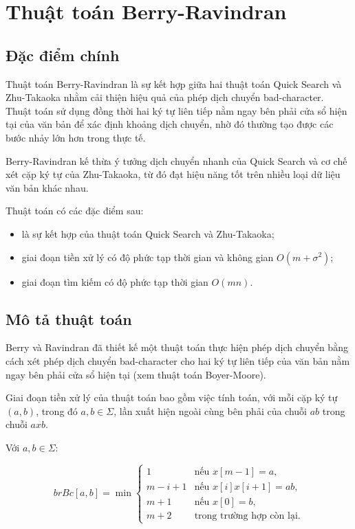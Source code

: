 \section{Thuật toán Berry-Ravindran}

\subsection{Đặc điểm chính}

Thuật toán Berry-Ravindran là sự kết hợp giữa hai thuật toán Quick Search và Zhu-Takaoka nhằm cải thiện hiệu quả của phép dịch chuyển bad-character. Thuật toán sử dụng đồng thời hai ký tự liên tiếp nằm ngay bên phải cửa sổ hiện tại của văn bản để xác định khoảng dịch chuyển, nhờ đó thường tạo được các bước nhảy lớn hơn trong thực tế.

Berry-Ravindran kế thừa ý tưởng dịch chuyển nhanh của Quick Search và cơ chế xét cặp ký tự của Zhu-Takaoka, từ đó đạt hiệu năng tốt trên nhiều loại dữ liệu văn bản khác nhau.

Thuật toán có các đặc điểm sau:
\begin{itemize}
    \item là sự kết hợp của thuật toán Quick Search và Zhu-Takaoka;
    \item giai đoạn tiền xử lý có độ phức tạp thời gian và không gian $O(m + \sigma ^ 2)$;
    \item giai đoạn tìm kiếm có độ phức tạp thời gian $O(mn)$.
\end{itemize}

\subsection{Mô tả thuật toán}

Berry và Ravindran đã thiết kế một thuật toán thực hiện phép dịch chuyển bằng cách xét phép dịch chuyển bad-character cho hai ký tự liên tiếp của văn bản nằm ngay bên phải cửa sổ hiện tại (xem thuật toán Boyer-Moore).

Giai đoạn tiền xử lý của thuật toán bao gồm việc tính toán, với mỗi cặp ký tự $(a, b)$, trong đó $a,b \in \Sigma$, lần xuất hiện ngoài cùng bên phải của chuỗi $ab$ trong chuỗi $axb$.

Với $a,b \in \Sigma$:

\[
brBc[a,b]
=
\min \left\{
\begin{array}{ll}
1 & \text{nếu } x[m - 1] = a, \\

m - i + 1 & \text{nếu } x[i]x[i+1] = ab, \\

m + 1 & \text{nếu } x[0] = b, \\

m + 2 & \text{trong trường hợp còn lại.}
\end{array}
\right.
\]

